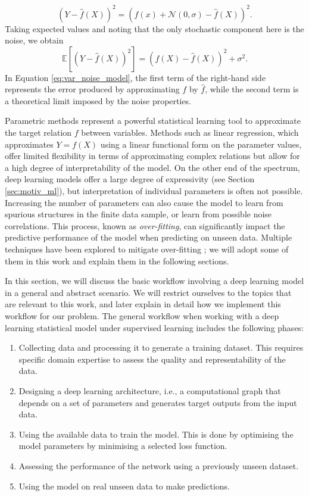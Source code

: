 $$(Y-\hat{f}(X))^2=(f(x)+\mathcal{N}(0,\sigma)-\hat{f}(X))^2.$$
Taking expected values and noting that the only stochastic component here is the noise, we obtain 
\begin{equation}\label{eq:var_noise_model}
    \mathbb{E}[(Y-\hat{f}(X))^2]=(f(X)-\hat{f}(X))^2+\sigma^2.
\end{equation}
In Equation \ref{eq:var_noise_model}, the first term of the right-hand side represents the error produced by approximating $f$ by $\hat{f}$, while the second term is a theoretical limit imposed by the noise properties.

Parametric methods represent a powerful statistical learning tool to approximate the target relation $f$ between variables.
Methods such as linear regression, which approximates $Y=f(X)$ using a linear functional form on the parameter values, offer limited flexibility in terms of approximating complex relations but allow for a high degree of interpretability of the model. On the other end of the spectrum, deep learning models offer a large degree of expressivity (see Section \ref{sec:motiv_ml}), but interpretation of individual parameters is often not possible. Increasing the number of parameters can also cause the model to learn from spurious structures in the finite data sample, or learn from possible noise correlations. This process, known as \emph{over-fitting}, can significantly impact the predictive performance of the model when predicting on unseen data. Multiple techniques have been explored to mitigate over-fitting \cite{overfitting}; we will adopt some of them in this work and explain them in the following sections.

In this section, we will discuss the basic workflow involving a deep learning model in a general and abstract scenario. We will restrict ourselves to the topics that are relevant to this work, and later explain in detail how we implement this workflow for our problem.
The general workflow when working with a deep learning statistical model under supervised learning includes the following phases:
\begin{enumerate}
    \item Collecting data and processing it to generate a training dataset. This requires specific domain expertise to assess the quality and representability of the data.
    \item Designing a deep learning architecture, i.e., a computational graph that depends on a set of parameters and generates target outputs from the input data.
    \item Using the available data to train the model. This is done by optimising the model parameters by minimising a selected loss function.
    \item Assessing the performance of the network using a previously unseen dataset.
    \item Using the model on real unseen data to make predictions.
\end{enumerate}

